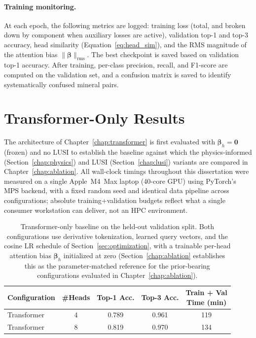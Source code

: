 \documentclass[11pt]{report}
\begin{document}
\paragraph{Training monitoring.}
At each epoch, the following metrics are logged: training loss (total, and broken down by component when auxiliary losses are active), validation top-1 and top-3 accuracy, head similarity (Equation~\ref{eq:head_sim}), and the RMS magnitude of the attention bias $\|\bm{\beta}\|_{\text{rms}}$. The best checkpoint is saved based on validation top-1 accuracy. After training, per-class precision, recall, and F1-score are computed on the validation set, and a confusion matrix is saved to identify systematically confused mineral pairs.

\section{Transformer-Only Results}
\label{sec:trans_only_results}

The architecture of Chapter~\ref{chap:transformer} is first evaluated with $\bm{\beta}_h = \mathbf{0}$ (frozen) and no LUSI to establish the baseline against which the physics-informed (Section~\ref{chap:physics}) and LUSI (Section~\ref{chap:lusi}) variants are compared in Chapter~\ref{chap:ablation}.
All wall-clock timings throughout this dissertation were measured on a single Apple~M4~Max laptop (40-core GPU) using PyTorch's MPS backend, with a fixed random seed and identical data pipeline across configurations; absolute training+validation budgets reflect what a single consumer workstation can deliver, not an HPC environment.

\begin{table}[!htbp]
\centering
\caption{Transformer-only baseline on the held-out validation split. Both configurations use derivative tokenization, learned query vectors, and the cosine LR schedule of Section~\ref{sec:optimization}, with a trainable per-head attention bias $\bm{\beta}_h$ initialized at zero (Section~\ref{chap:ablation} establishes this as the parameter-matched reference for the prior-bearing configurations evaluated in Chapter~\ref{chap:ablation}).}
\label{tab:trans_only_results}
\begin{tabular}{lcccc}
\hline
\rowcolor{gray!25}
\textbf{Configuration} & \textbf{\#Heads} & \textbf{Top-1 Acc.} & \textbf{Top-3 Acc.} & \shortstack{\textbf{Train + Val} \\ \textbf{Time (min)}} \\
\hline
Transformer & 4 & 0.789 & 0.961 & 119 \\
Transformer & 8 & 0.819 & 0.970 & 134 \\
\hline
\end{tabular}
\end{table}
\end{document}
